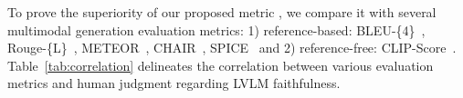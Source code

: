 
To prove the superiority of our proposed metric \ours, we compare it with several multimodal generation evaluation metrics: 1) reference-based: BLEU-\{4\}~\cite{bleu}, Rouge-\{L\}~\cite{ROUGE}, METEOR~\cite{meteor}, CHAIR~\cite{DBLP:conf/emnlp/RohrbachHBDS18}, SPICE~\cite{DBLP:conf/eccv/AndersonFJG16} and 2) reference-free: CLIP-Score~\cite{clipscore}. 
Table~\ref{tab:correlation} delineates the correlation between various evaluation metrics and human judgment regarding LVLM faithfulness.
% 
